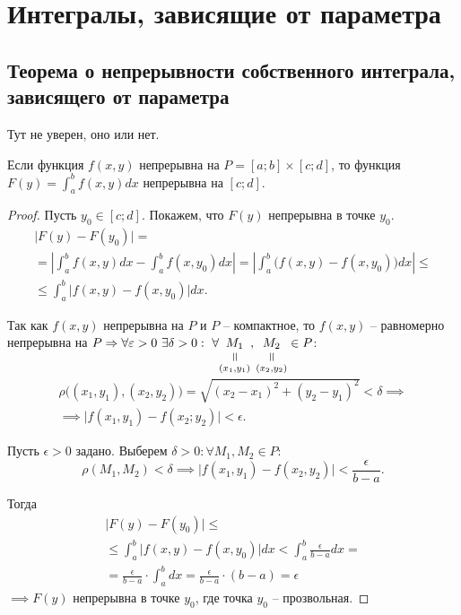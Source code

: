 \section{Интегралы, зависящие от параметра}

\setcounter{subsection}{104}

\subsection{Теорема о непрерывности собственного интеграла, зависящего от параметра}

Тут не уверен, оно или нет.

\begin{theorem}\label{theorem:7.1.1}
    Если функция $f(x,y)$ непрерывна на $P = [a;b] \times [c;d]$, то функция $F(y) = \int_{a}^{b}f(x,y)dx$ непрерывна на $[c;d]$.
\end{theorem}

\begin{proof}
    Пусть $y_0 \in [c;d]$. Покажем, что $F(y)$ непрерывна в точке $y_0$.
    \begin{multline*}
        \big|F(y) - F(y_0)\big| = \\
        = \left|\int_{a}^{b}f(x,y)dx - \int_{a}^{b}f(x,y_0)dx\right| = \left|\int_{a}^{b}\big(f(x,y) - f(x,y_0)\big)dx\right| \leqslant \\
        \leqslant \int_{a}^{b}\big|f(x,y) - f(x,y_0)\big|dx.
    \end{multline*}

    Так как $f(x,y)$ непрерывна на $P$ и $P$ -- компактное, то $f(x,y)$ -- равномерно непрерывна на $P \implies \forall \epsilon > 0 \ \exists \delta > 0: \ \forall \equalto{M_1}{(x_1,y_1)},\equalto{M_2}{(x_2,y_2)} \in P$:
    \begin{multline*}
        \rho\big((x_1,y_1),(x_2,y_2)\big) = \sqrt{(x_2 - x_1)^2 + (y_2 - y_1)^2} < \delta \implies \\
        \implies \big|f(x_1,y_1) - f(x_2;y_2)\big| < \epsilon.
    \end{multline*}

    Пусть $\epsilon > 0$ задано. Выберем $\delta > 0: \forall M_1,M_2 \in P$:
    \[
        \rho(M_1,M_2) < \delta \implies \big|f(x_1,y_1) - f(x_2,y_2)\big| < \frac{\epsilon}{b - a}.
    \]

    Тогда
    \begin{multline*}
        \big|F(y) - F(y_0)\big| \leqslant \\
        \leqslant \int_{a}^{b}\big|f(x,y) - f(x,y_0)\big|dx < \int_{a}^{b}\frac{\epsilon}{b-a}dx = \\
        = \frac{\epsilon}{b - a} \cdot \int_{a}^{b}dx = \frac{\epsilon}{b - a} \cdot (b-a) = \epsilon
    \end{multline*}
    $\implies F(y)$ непрерывна в точке $y_0$, где точка $y_0$ -- прозвольная.
\end{proof}

